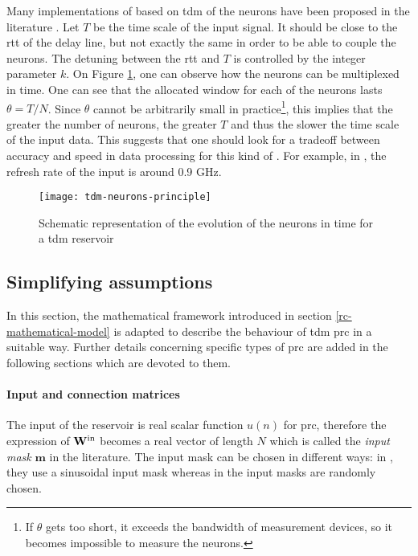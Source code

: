  Many implementations of \rcer based on \gls{tdm} of the neurons have been proposed in the literature \cite{Paquot2012, Antonik2017, Duport2016, Dejonckheere2014, Vandoorne2008, Vinckier2015}. Let $T$ be the time scale of the input signal. It should be close to the \gls{rtt} of the delay line, but not  exactly the same in order to be able to couple the neurons. The detuning between the \gls{rtt} and $T$ is controlled by the integer parameter $k$. On Figure \ref{tdm-neurons-principle}, one can observe how the neurons can be multiplexed in time. One can see that the allocated window for each of the neurons lasts $\theta = T/N$. Since $\theta$ cannot be arbitrarily small in practice\footnote{If $\theta$ gets too short, it exceeds the bandwidth of measurement devices, so it becomes impossible to measure the neurons.}, this implies that the greater the number of neurons, the greater $T$ and thus the slower the time scale of the input data. This suggests that one should look for a tradeoff between accuracy and speed in data processing for this kind of \rcer. For example, in \cite{Vinckier2015}, the refresh rate of the input is around 0.9 GHz.
 
 \begin{figure}[h]
 	\centering
 	\texttt{[image: tdm-neurons-principle]}
 	\caption{Schematic representation of the evolution of the neurons in time for a \gls{tdm} reservoir}
 	\label{tdm-neurons-principle}
 \end{figure}
 


\subsection{Simplifying assumptions}

In this section, the mathematical framework introduced in section \ref{rc-mathematical-model} is adapted to describe the behaviour of \gls{tdm} \gls{prc} in a suitable way. Further details concerning specific types of \gls{prc} are added in the following sections which are devoted to them.

\paragraph{Input and connection matrices}

The input of the reservoir is real scalar function $u(n)$ for \gls{prc}, therefore the expression of $\mathbf{W}^{\text{in}}$ becomes a real vector of length $N$ which is called the \textit{input mask} $\mathbf{m}$ in the literature. The input mask can be chosen in different ways: in \cite{Duport2016}, they use a sinusoidal input mask whereas in \cite{Antonik2017, Vinckier2015, Paquot2012} the input masks are randomly chosen.\\

